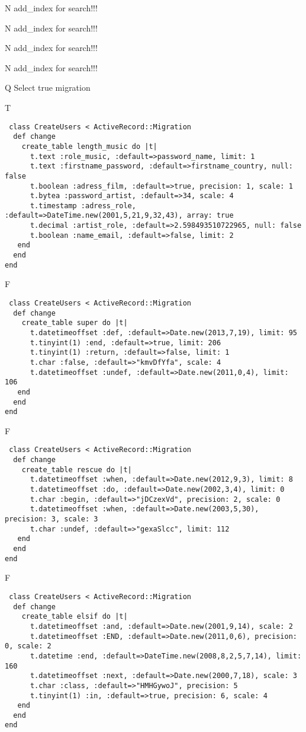 N
add_index for search!!!
  
N
add_index for search!!!
  
N
add_index for search!!!
  
N
add_index for search!!!
  
Q
Select true migration

T
\begin{verbatim}
 class CreateUsers < ActiveRecord::Migration 
  def change 
    create_table length_music do |t| 
      t.text :role_music, :default=>password_name, limit: 1
      t.text :firstname_password, :default=>firstname_country, null: false
      t.boolean :adress_film, :default=>true, precision: 1, scale: 1
      t.bytea :password_artist, :default=>34, scale: 4
      t.timestamp :adress_role, :default=>DateTime.new(2001,5,21,9,32,43), array: true
      t.decimal :artist_role, :default=>2.598493510722965, null: false
      t.boolean :name_email, :default=>false, limit: 2
   end 
  end 
end
\end{verbatim}

F
\begin{verbatim}
 class CreateUsers < ActiveRecord::Migration 
  def change 
    create_table super do |t| 
      t.datetimeoffset :def, :default=>Date.new(2013,7,19), limit: 95
      t.tinyint(1) :end, :default=>true, limit: 206
      t.tinyint(1) :return, :default=>false, limit: 1
      t.char :false, :default=>"kmvDfYfa", scale: 4
      t.datetimeoffset :undef, :default=>Date.new(2011,0,4), limit: 106
   end 
  end 
end
\end{verbatim}

F
\begin{verbatim}
 class CreateUsers < ActiveRecord::Migration 
  def change 
    create_table rescue do |t| 
      t.datetimeoffset :when, :default=>Date.new(2012,9,3), limit: 8
      t.datetimeoffset :do, :default=>Date.new(2002,3,4), limit: 0
      t.char :begin, :default=>"jDCzexVd", precision: 2, scale: 0
      t.datetimeoffset :when, :default=>Date.new(2003,5,30), precision: 3, scale: 3
      t.char :undef, :default=>"gexaSlcc", limit: 112
   end 
  end 
end
\end{verbatim}

F
\begin{verbatim}
 class CreateUsers < ActiveRecord::Migration 
  def change 
    create_table elsif do |t| 
      t.datetimeoffset :and, :default=>Date.new(2001,9,14), scale: 2
      t.datetimeoffset :END, :default=>Date.new(2011,0,6), precision: 0, scale: 2
      t.datetime :end, :default=>DateTime.new(2008,8,2,5,7,14), limit: 160
      t.datetimeoffset :next, :default=>Date.new(2000,7,18), scale: 3
      t.char :class, :default=>"HMHGywoJ", precision: 5
      t.tinyint(1) :in, :default=>true, precision: 6, scale: 4
   end 
  end 
end
\end{verbatim}
